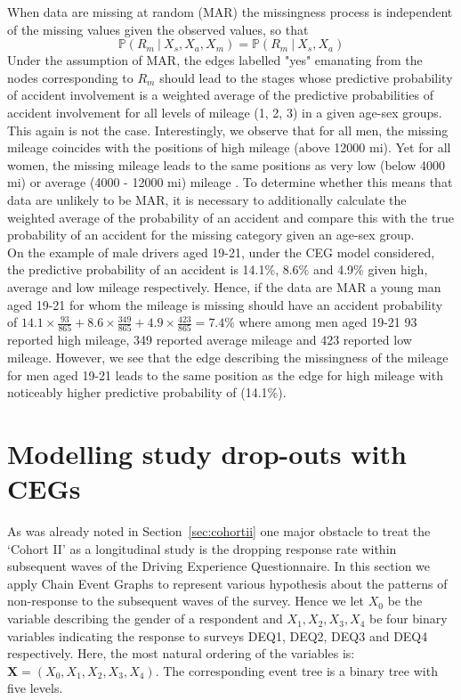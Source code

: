 \documentclass[runningheads]{llncs}
\begin{document}
When data are missing at random (MAR) the missingness process is independent of the missing values 
given the observed values, so that 
\[\mathbb{P}(R_m \ | \ X_s, X_a, X_m) =  \mathbb{P}(R_m \ | \ X_s, X_a)\]
Under the assumption of MAR, the edges labelled "yes" emanating from the nodes corresponding to $R_m$ should lead to the stages whose predictive probability of accident involvement is a weighted average of the predictive probabilities of accident involvement for all levels of mileage (1, 2, 3) in a given age-sex groups. 
This again is not the case. Interestingly, we observe that for all men, the missing mileage coincides with the positions of high mileage (above 12000 mi). Yet for all women, the missing mileage leads to the same positions as very low (below 4000 mi) or average (4000 - 12000 mi) mileage . To determine whether this means that data are unlikely to be MAR, it is necessary to additionally calculate the weighted average of the probability of an accident and compare this with the true probability of an accident for the missing category given an age-sex group. \\
On the example of male drivers aged 19-21, under the CEG model considered, the predictive probability of an accident is 14.1\%, 8.6\% and 4.9\% given high, average and low mileage respectively. Hence, if the data are MAR a young man aged 19-21 for whom the mileage is missing should have an accident probability of $14.1 \times \frac{93}{865} + 8.6 \times \frac{349}{865} + 4.9 \times \frac{423}{865} = 7.4\%$ where among men aged 19-21 93 reported high mileage, 349 reported average mileage and 423 reported low mileage. However, we see that the edge describing the missingness of the mileage for men aged 19-21 leads to the same position as the edge for high mileage with noticeably higher predictive probability of (14.1\%). 

\section{Modelling study drop-outs with CEGs}\label{sec:dropouts}
As was already noted in Section~\ref{sec:cohortii} one major obstacle to treat the `Cohort II' as a longitudinal study is the dropping response rate within subsequent waves of the Driving Experience Questionnaire.
In this section we apply Chain Event Graphs to represent various hypothesis about the patterns of non-response to the subsequent waves of the survey. Hence we let $X_0$ be the variable describing the gender of a respondent and $X_1, X_2, X_3, X_4$ be four binary variables indicating the response to surveys DEQ1, DEQ2, DEQ3 and DEQ4 respectively. Here, the most natural ordering of the variables is: $\boldsymbol{X} = (X_0, X_1, X_2, X_3, X_4)$. The corresponding event tree is a binary tree with five levels.
\end{document}
